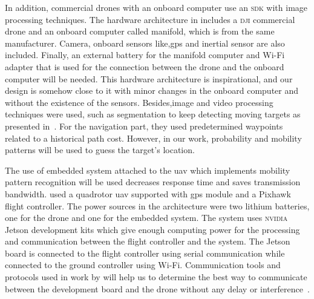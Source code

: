 \documentclass[../main.tex]{subfiles}
\begin{document}
In addition, commercial drones with an onboard computer use an \textsc{sdk} with image processing techniques.
The hardware architecture in \citeauthor{Wang18} includes a \textsc{dji} 
commercial drone and an onboard computer called manifold, which is from the same manufacturer.
Camera, onboard sensors like,\gls{gps} and inertial sensor are also included. Finally, an external battery for the manifold computer and Wi-Fi adapter that is used for the connection between the drone and the onboard computer will be needed. This hardware architecture is inspirational, and our design is somehow close to it with minor changes in the onboard computer and 
without the existence of the sensors. Besides,image and video processing techniques were used, such as 
segmentation to keep detecting moving targets as presented in~\cite{Wang18}.
For the navigation part, they used predetermined waypoints related to a historical path cost. 
However, in our work, probability and mobility patterns will be used to guess the target's location.

The use of embedded system attached to the \gls{uav} which implements mobility pattern recognition will be used decreases response time and saves transmission bandwidth. 
\citeauthor{Zhao18} used a quadrotor \gls{uav} supported with \gls{gps} module and a 
Pixhawk flight controller. The power sources in the architecture were two lithium batteries, 
one for the drone and one for the embedded system. The system uses \textsc{nvidia} Jetson development
kits which give enough computing power for the processing and communication between the flight 
controller and the system. The Jetson board is connected to the flight controller using serial 
communication while connected to the ground controller using Wi-Fi. Communication tools and protocols used in work by \citeauthor{Zhao18} will help us to determine the best way to communicate between the development board and the drone without any delay or interference~\cite{Zhao18}. 

\end{document}
